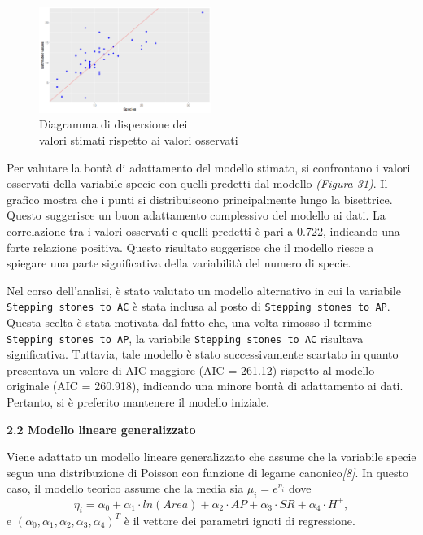 \documentclass{article} %
\begin{document}
\begin{figure}[H]
    \centering
    \includegraphics[width=0.5\textwidth]{immagini/res_val_oss_lm.png}
    \captionsetup{justification=centering}
    \caption{Diagramma di dispersione dei \\valori stimati rispetto ai valori osservati}
\end{figure}

Per valutare la bontà di adattamento del modello stimato, si confrontano i valori osservati della variabile specie con quelli predetti dal modello \textit{(Figura 31)}. Il grafico mostra che i punti si distribuiscono principalmente lungo la bisettrice. Questo suggerisce un buon adattamento complessivo del modello ai dati. La correlazione tra i valori osservati e quelli predetti è pari a 0.722, indicando una forte relazione positiva. Questo risultato suggerisce che il modello riesce a spiegare una parte significativa della variabilità del numero di specie.

Nel corso dell'analisi, è stato valutato un modello alternativo in cui la variabile \texttt{Stepping stones to AC} è stata inclusa al posto di \texttt{Stepping stones to AP}. Questa scelta è stata motivata dal fatto che, una volta rimosso il termine \texttt{Stepping stones to AP}, la variabile \texttt{Stepping stones to AC} risultava significativa. Tuttavia, tale modello è stato successivamente scartato in quanto presentava un valore di AIC maggiore (AIC = 261.12) rispetto al modello originale (AIC = 260.918), indicando una minore bontà di adattamento ai dati. Pertanto, si è preferito mantenere il modello iniziale.

\vskip 20pt
\begin{flushleft}
    \textbf{\Large 2.2 \: Modello lineare generalizzato}
\end{flushleft}
\vskip 10pt

Viene adattato un modello lineare generalizzato che assume che la variabile specie segua una distribuzione di Poisson con funzione di legame canonico\textit{[8]}. In questo caso, il modello teorico assume che la media sia $\mu_i=e^{\eta_i}$ dove
\[
\eta_i=\alpha_0+\alpha_1 \cdot ln(Area)+\alpha_2\cdot AP +\alpha_3\cdot SR+\alpha_4\cdot H^+ ,
\]
e $(\alpha_0,\alpha_1,\alpha_2,\alpha_3,\alpha_4)^T$ è il vettore dei parametri ignoti di regressione.
\end{document}
